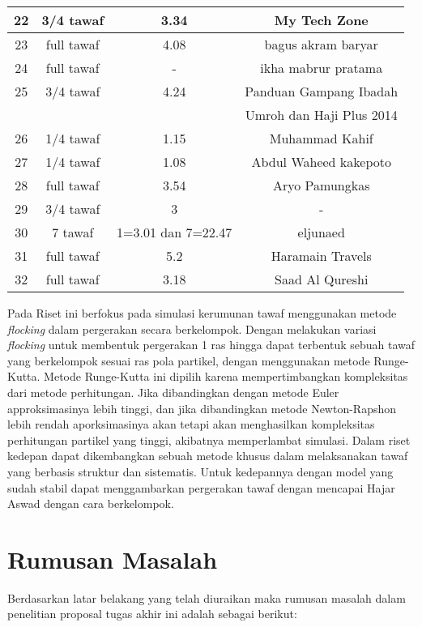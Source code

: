 \begin{table}[H]
\begin{tabular}{|c|c|c|c|}
\hline
22&3/4 tawaf&	3.34&My Tech Zone\\
\hline
23&full tawaf&	4.08&bagus akram baryar\\

\hline
24&full tawaf&	-&ikha mabrur pratama\\

\hline
25&3/4 tawaf&	4.24&Panduan Gampang Ibadah \\
& & &Umroh dan Haji  Plus 2014\\
	
\hline
26&1/4 tawaf &	1.15&Muhammad Kahif\\

\hline
27&1/4 tawaf &	1.08&Abdul Waheed kakepoto\\
	
\hline
28&full tawaf&	3.54&	Aryo Pamungkas\\

\hline
29&3/4 tawaf&	3&-\\

\hline
30&7 tawaf&	1=3.01 dan 7=22.47&eljunaed\\
\hline
31&full tawaf&	5.2&Haramain Travels\\

\hline
32&full tawaf&	3.18&Saad Al Qureshi\\
\hline

\end{tabular}
\end{table}

		
\hspace{0.6cm}Pada Riset ini berfokus pada simulasi kerumunan tawaf menggunakan metode \emph{flocking} dalam pergerakan secara berkelompok. Dengan melakukan variasi \emph{flocking} untuk membentuk pergerakan 1 ras hingga dapat terbentuk sebuah tawaf yang berkelompok sesuai ras pola partikel, dengan menggunakan metode Runge-Kutta. Metode Runge-Kutta ini dipilih karena mempertimbangkan kompleksitas dari metode perhitungan. Jika dibandingkan dengan metode Euler approksimasinya lebih tinggi, dan jika dibandingkan metode Newton-Rapshon lebih rendah aporksimasinya akan tetapi akan menghasilkan kompleksitas perhitungan partikel yang tinggi, akibatnya memperlambat simulasi.
Dalam riset kedepan dapat dikembangkan sebuah metode khusus dalam melaksanakan tawaf yang berbasis struktur dan sistematis. Untuk kedepannya dengan model yang sudah stabil dapat menggambarkan pergerakan tawaf dengan mencapai Hajar Aswad dengan cara berkelompok.   


\section{Rumusan Masalah}\label{sec:rumusan}
Berdasarkan latar belakang yang telah diuraikan maka rumusan masalah dalam penelitian proposal tugas akhir ini adalah sebagai berikut: 

